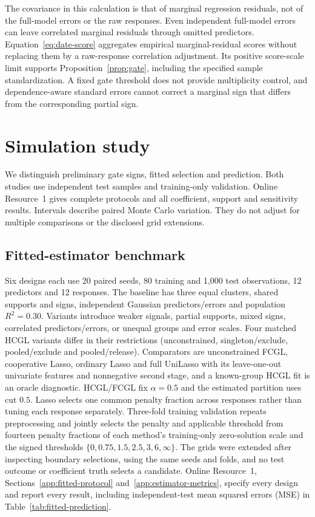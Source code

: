 \documentclass[lineno,pdflatex,sn-basic]{sn-jnl}
\theoremstyle{thmstyleone}
\begin{document}
The covariance in this calculation is that of marginal regression residuals,
not of the full-model errors or the raw responses. Even independent full-model
errors can leave correlated marginal residuals through omitted predictors.
Equation~\eqref{eq:date-score} aggregates empirical marginal-residual scores
without replacing them by a raw-response correlation adjustment. Its positive
score-scale limit supports Proposition~\ref{prop:gate}, including the specified
sample standardization. A fixed gate threshold does not provide multiplicity
control, and dependence-aware standard errors cannot correct a marginal sign
that differs from the corresponding partial sign.
\FloatBarrier
\section{Simulation study} \label{sec:simulation}

We distinguish preliminary gate signs, fitted selection and prediction. Both
studies use independent test samples and training-only validation. Online
Resource~1 gives complete protocols and all coefficient, support and sensitivity
results. Intervals describe paired Monte Carlo variation. They do not adjust
for multiple comparisons or the disclosed grid extensions.

\subsection{Fitted-estimator benchmark}\label{sec:fitted-benchmark}

Six designs each use 20 paired seeds, 80 training and 1,000 test observations,
12 predictors and 12 responses. The baseline has three equal clusters, shared
supports and signs, independent Gaussian predictors/errors and population
$R^2=0.30$. Variants introduce weaker signals, partial supports, mixed signs,
correlated predictors/errors, or unequal groups and error scales. Four matched
HCGL variants differ in their restrictions (unconstrained, singleton/exclude,
pooled/exclude and pooled/release). Comparators are unconstrained FCGL,
cooperative Lasso, ordinary Lasso and full UniLasso with its leave-one-out
univariate features and nonnegative second stage, and a known-group HCGL fit is
an oracle diagnostic. HCGL/FCGL fix $\alpha=0.5$ and the estimated partition
uses cut $0.5$. Lasso selects one common penalty fraction across responses
rather than tuning each response separately. Three-fold training validation
repeats preprocessing and jointly selects the penalty and applicable threshold
from fourteen penalty fractions of each method's training-only zero-solution
scale and the signed thresholds $\{0,0.75,1.5,2.5,3,6,\infty\}$. The grids were
extended after inspecting boundary selections, using the same seeds and folds,
and no test outcome or coefficient truth selects a candidate. Online
Resource~1, Sections~\ref{app:fitted-protocol} and~\ref{app:estimator-metrics},
specify every design and report every result, including independent-test
mean squared errors (MSE) in Table~\ref{tab:fitted-prediction}.
\end{document}
